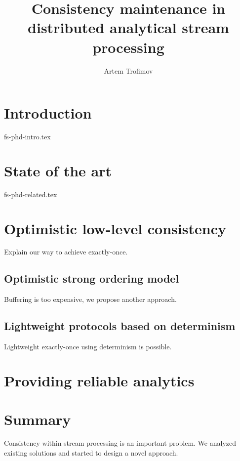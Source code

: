 \documentclass{llncs}
\begin{document}
\title {Consistency maintenance in distributed analytical stream processing}
\author{Artem Trofimov}

\maketitle

\begin{abstract}

\end {abstract}

\section {Introduction}
 {fs-phd-intro.tex}

\section {State of the art}
 {fs-phd-related.tex}

\section {Optimistic low-level consistency}
\label{fs-phd-optimistic}
Explain our way to achieve exactly-once.

\subsection{Optimistic strong ordering model}
Buffering is too expensive, we propose another approach.

\subsection{Lightweight protocols based on determinism}
Lightweight exactly-once using determinism is possible. 

\section{Providing reliable analytics}
\label{fs-phd-reliable}

\section {Summary}
\label{fs-phd-summary}
Consistency within stream processing is an important problem. We analyzed existing solutions and started to design a novel approach.



\end{document}
